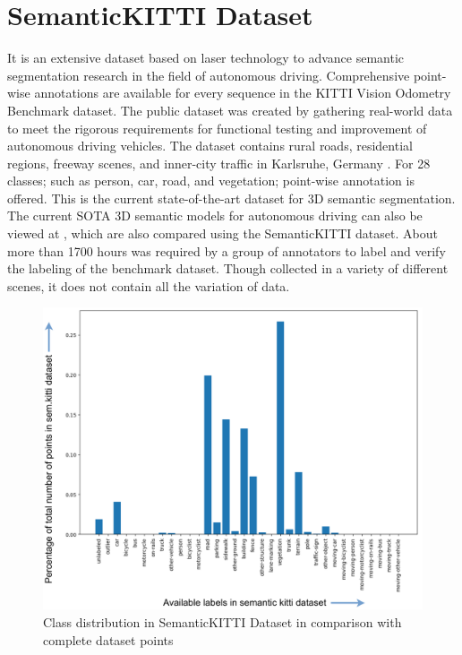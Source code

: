 \section{SemanticKITTI Dataset}
It is an extensive dataset based on laser technology to advance semantic segmentation research in the field of autonomous driving. Comprehensive point-wise annotations are available for every sequence in the KITTI Vision Odometry Benchmark dataset. The public dataset was created by gathering real-world data to meet the rigorous requirements for functional testing and improvement of autonomous driving vehicles. The dataset contains rural roads, residential regions, freeway scenes, and inner-city traffic in Karlsruhe, Germany \parencite{Geiger2012CVPR}. For 28 classes; such as person, car, road, and vegetation; point-wise annotation is offered. This is the current state-of-the-art dataset for 3D semantic segmentation. The current SOTA 3D semantic models for autonomous driving can also be viewed at \parencite{papers-with-code}, which are also compared using the SemanticKITTI dataset. About more than 1700 hours \parencite{behley2019semantickitti} was required by a group of annotators to label and verify the labeling of the benchmark dataset. Though collected in a variety of different scenes, it does not contain all the variation of data.

\begin{figure}[htb]
    \centering
    \includegraphics[width=1\linewidth]{97_graphics//related_work/ratio_with_total_points_kitti.pdf}
    \caption{Class distribution in SemanticKITTI Dataset in comparison with complete dataset points}
    \label{fig:related_work-ratio_with_total_points_kitti}
\end{figure}

